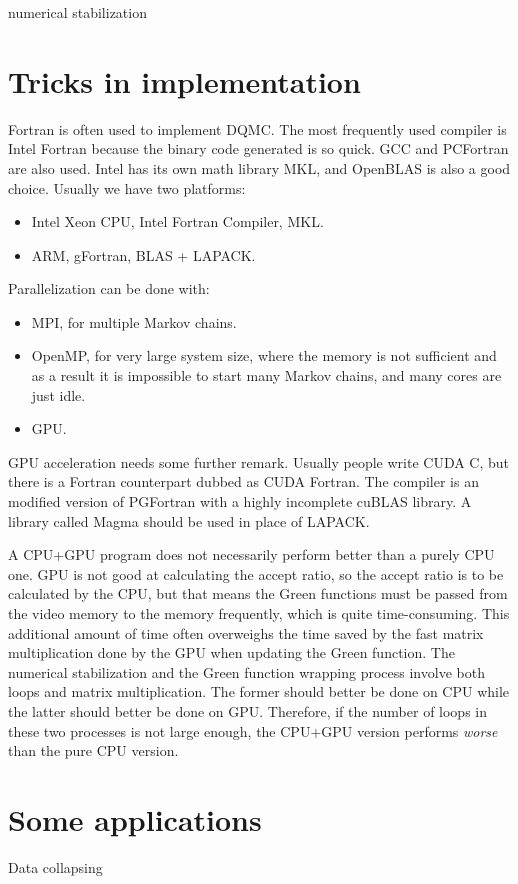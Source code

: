 \documentclass[hyperref, a4paper]{article}
\begin{document}
numerical stabilization

\section{Tricks in implementation}

Fortran is often used to implement DQMC. The most frequently used compiler is Intel Fortran because the binary code generated is so quick. 
GCC and PCFortran are also used.
Intel has its own math library MKL, and OpenBLAS is also a good choice.
Usually we have two platforms:
\begin{itemize}
    \item Intel Xeon CPU, Intel Fortran Compiler, MKL.
    \item ARM, gFortran, BLAS + LAPACK.
\end{itemize}
Parallelization can be done with:
\begin{itemize}
    \item MPI, for multiple Markov chains.
    \item OpenMP, for very large system size, where the memory is not sufficient and as a result it is impossible to start many Markov chains, and many cores are just idle.
    \item GPU.
\end{itemize}

GPU acceleration needs some further remark. Usually people write CUDA C, but there is a Fortran counterpart dubbed as CUDA Fortran.
The compiler is an modified version of PGFortran with a highly incomplete cuBLAS library.
A library called Magma should be used in place of LAPACK. 

A CPU+GPU program does not necessarily perform better than a purely CPU one.
GPU is not good at calculating the accept ratio, so the accept ratio is to be calculated by the CPU, but that means the Green functions must be passed from the video memory to the memory frequently, which is quite time-consuming.
This additional amount of time often overweighs the time saved by the fast matrix multiplication done by the GPU when updating the Green function.
The numerical stabilization and the Green function wrapping process involve both loops and matrix multiplication.
The former should better be done on CPU while the latter should better be done on GPU.
Therefore, if the number of loops in these two processes is not large enough, the CPU+GPU version performs \emph{worse} than the pure CPU version.

\section{Some applications}

Data collapsing 
\end{document}

